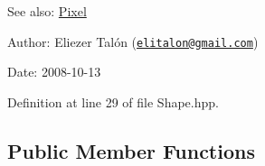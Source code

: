 \begin{Desc}
\item[See also:]\hyperlink{_pixel_8hpp_535e59456e3e633842529cfa8ea103c4}{Pixel}\end{Desc}
\begin{Desc}
\item[Author:]Eliezer Talón (\href{mailto:elitalon@gmail.com}{\tt elitalon@gmail.com}) \end{Desc}
\begin{Desc}
\item[Date:]2008-10-13 \end{Desc}


Definition at line 29 of file Shape.hpp.\subsection*{Public Member Functions}
